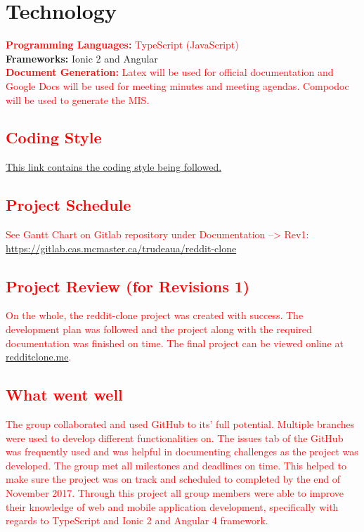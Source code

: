 \documentclass[12pt,fleqn]{article}
\begin{document}
\section {Technology}
\textcolor{red}{\textbf{Programming Languages: }TypeScript (JavaScript)} \\ 
\textbf{Frameworks: }Ionic 2 and Angular \\
\textcolor{red}{\textbf{Document Generation: } Latex will be used for official documentation and Google Docs will be used for meeting minutes and meeting agendas. Compodoc will be used to generate the MIS.}

\textcolor{red}{\section {Coding Style}
 \href{https://google.github.io/styleguide/javascriptguide.xml}{This link contains the coding style being followed.}}

\textcolor{red}{\section {Project Schedule}
See Gantt Chart on Gitlab repository under Documentation --> Rev1: \url{https://gitlab.cas.mcmaster.ca/trudeaua/reddit-clone}}

\textcolor{red}{\section {Project Review (for Revisions 1)}
On the whole, the reddit-clone project was created with success.  The development plan was followed and the project along with the required documentation was finished on time.  The final project can be viewed online at \href{https://redditclone.me/}{redditclone.me}.}

\textcolor{red}{\subsection{What went well}
The group collaborated and used GitHub to its' full potential.  Multiple branches were used to develop different functionalities on.  The issues tab of the GitHub was frequently used and was helpful in documenting challenges as the project was developed.  The group met all milestones and deadlines on time.  This helped to make sure the project was on track and scheduled to completed by the end of November 2017.  Through this project all group members were able to improve their knowledge of web and mobile application development, specifically with regards to TypeScript and Ionic 2 and Angular 4 framework.  }
\end{document}
